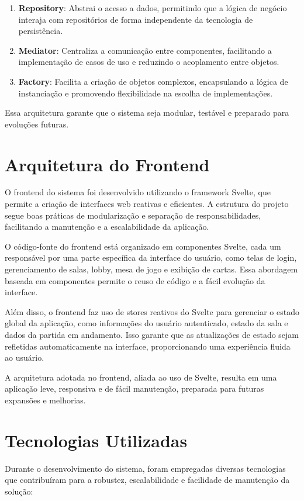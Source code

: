 \begin{enumerate}
    \item \textbf{Repository}: Abstrai o acesso a dados, permitindo que a lógica de negócio interaja com repositórios de forma independente da tecnologia de persistência.
    \item \textbf{Mediator}: Centraliza a comunicação entre componentes, facilitando a implementação de casos de uso e reduzindo o acoplamento entre objetos.
    \item \textbf{Factory}: Facilita a criação de objetos complexos, encapsulando a lógica de instanciação e promovendo flexibilidade na escolha de implementações.
\end{enumerate}

Essa arquitetura garante que o sistema seja modular, testável e preparado para evoluções futuras.

\section{Arquitetura do Frontend}
O frontend do sistema foi desenvolvido utilizando o framework Svelte, que permite a criação de interfaces web reativas e eficientes. A estrutura do projeto segue boas práticas de modularização e separação de responsabilidades, facilitando a manutenção e a escalabilidade da aplicação.

O código-fonte do frontend está organizado em componentes Svelte, cada um responsável por uma parte específica da interface do usuário, como telas de login, gerenciamento de salas, lobby, mesa de jogo e exibição de cartas. Essa abordagem baseada em componentes permite o reuso de código e a fácil evolução da interface.

Além disso, o frontend faz uso de stores reativos do Svelte para gerenciar o estado global da aplicação, como informações do usuário autenticado, estado da sala e dados da partida em andamento. Isso garante que as atualizações de estado sejam refletidas automaticamente na interface, proporcionando uma experiência fluida ao usuário.

A arquitetura adotada no frontend, aliada ao uso de Svelte, resulta em uma aplicação leve, responsiva e de fácil manutenção, preparada para futuras expansões e melhorias.

\section{Tecnologias Utilizadas}
Durante o desenvolvimento do sistema, foram empregadas diversas tecnologias que contribuíram para a robustez, escalabilidade e facilidade de manutenção da solução:

